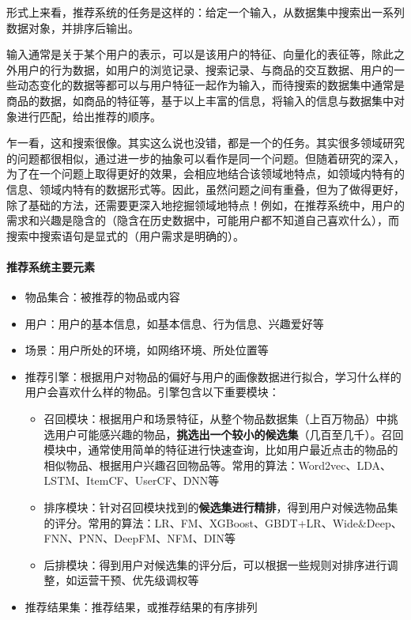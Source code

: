 形式上来看，推荐系统的任务是这样的：给定一个输入，从数据集中搜索出一系列数据对象，并排序后输出。

输入通常是关于某个用户的表示，可以是该用户的特征、向量化的表征等，除此之外用户的行为数据，如用户的浏览记录、搜索记录、与商品的交互数据、用户的一些动态变化的数据等都可以与用户特征一起作为输入，而待搜索的数据集中通常是商品的数据，如商品的特征等，基于以上丰富的信息，将输入的信息与数据集中对象进行匹配，给出推荐的顺序。

乍一看，这和搜索很像。其实这么说也没错，都是一个的任务。其实很多领域研究的问题都很相似，通过进一步的抽象可以看作是同一个问题。但随着研究的深入，为了在一个问题上取得更好的效果，会相应地结合该领域地特点，如领域内特有的信息、领域内特有的数据形式等。因此，虽然问题之间有重叠，但为了做得更好，除了基础的方法，还需要更深入地挖掘领域地特点！例如，在推荐系统中，用户的需求和兴趣是隐含的（隐含在历史数据中，可能用户都不知道自己喜欢什么），而搜索中搜索语句是显式的（用户需求是明确的）。

\paragraph{推荐系统主要元素}
\begin{itemize}
	\item 物品集合：被推荐的物品或内容
	\item 用户：用户的基本信息，如基本信息、行为信息、兴趣爱好等
	\item 场景：用户所处的环境，如网络环境、所处位置等
	\item 推荐引擎：根据用户对物品的偏好与用户的画像数据进行拟合，学习什么样的用户会喜欢什么样的物品。引擎包含以下重要模块：
	\begin{itemize}
		\item 召回模块：根据用户和场景特征，从整个物品数据集（上百万物品）中挑选用户可能感兴趣的物品，\textbf{挑选出一个较小的候选集}（几百至几千）。召回模块中，通常使用简单的特征进行快速查询，比如用户最近点击的物品的相似物品、根据用户兴趣召回物品等。常用的算法：Word2vec、LDA、LSTM、ItemCF、UserCF、DNN等
		\item 排序模块：针对召回模块找到的\textbf{候选集进行精排}，得到用户对候选物品集的评分。常用的算法：LR、FM、XGBoost、GBDT+LR、Wide\&Deep、FNN、PNN、DeepFM、NFM、DIN等
		\item 后排模块：得到用户对候选集的评分后，可以根据一些规则对排序进行调整，如运营干预、优先级调权等
	\end{itemize}
	\item 推荐结果集：推荐结果，或推荐结果的有序排列
\end{itemize}

